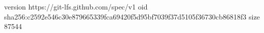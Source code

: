 version https://git-lfs.github.com/spec/v1
oid sha256:c2592e546c30e879665339fca69420f5d95bf7039f37d5105f36730cb86818f3
size 87544
